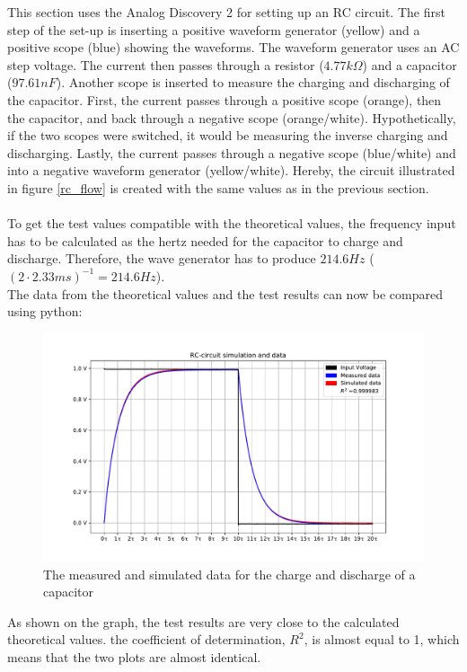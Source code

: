 This section uses the Analog Discovery 2 for setting up an RC circuit. The first step of the set-up is inserting a positive waveform generator (yellow) and a positive scope (blue) showing the waveforms. The waveform generator uses an AC step voltage. The current then passes through a resistor ($4.77 k\Omega$) and a capacitor ($97.61 nF$). Another scope is inserted to measure the charging and discharging of the capacitor. First, the current passes through a positive scope (orange), then the capacitor, and back through a negative scope (orange/white). Hypothetically, if the two scopes were switched, it would be measuring the inverse charging and discharging. Lastly, the current passes through a negative scope (blue/white) and into a negative waveform generator (yellow/white). Hereby, the circuit illustrated in figure \ref{rc_flow} is created with the same values as in the previous section. \\ \\
To get the test values compatible with the theoretical values, the frequency input has to be calculated as the hertz needed for the capacitor to charge and discharge. Therefore, the wave generator has to produce $214.6 Hz$  ($(2 \cdot 2.33 ms)^{-1} = 214.6 Hz$). \\
The data from the theoretical values and the test results can now be compared using python:
\begin{figure}[H]
\center
\includegraphics[scale=0.6]{fig/img/eks_1}
\caption{The measured and simulated data for the charge and discharge of a capacitor}
\label{fig:Cap}
\end{figure}
\noindent As shown on the graph, the test results are very close to the calculated theoretical values. the coefficient of determination, $R^2$, is almost equal to 1, which means that the two plots are almost identical.


